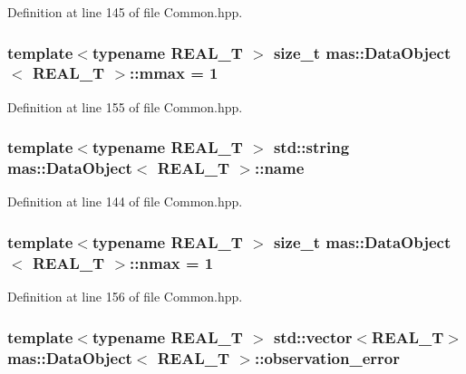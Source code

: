Definition at line 145 of file Common.\-hpp.

\hypertarget{structmas_1_1_data_object_aad1fab74aa21aaed012c6d50a77a8077}{
\subsubsection[{mmax}]{\setlength{\rightskip}{0pt plus 5cm}template$<$typename R\-E\-A\-L\-\_\-\-T $>$ size\-\_\-t {\bf mas\-::\-Data\-Object}$<$ R\-E\-A\-L\-\_\-\-T $>$\-::mmax = 1}}\label{structmas_1_1_data_object_aad1fab74aa21aaed012c6d50a77a8077}


Definition at line 155 of file Common.\-hpp.

\hypertarget{structmas_1_1_data_object_aa8aa73fed0094e9eb06dcc9aff390908}{
\subsubsection[{name}]{\setlength{\rightskip}{0pt plus 5cm}template$<$typename R\-E\-A\-L\-\_\-\-T $>$ std\-::string {\bf mas\-::\-Data\-Object}$<$ R\-E\-A\-L\-\_\-\-T $>$\-::name}}\label{structmas_1_1_data_object_aa8aa73fed0094e9eb06dcc9aff390908}


Definition at line 144 of file Common.\-hpp.

\hypertarget{structmas_1_1_data_object_aee973c338436ee4ee27a23a4bd855286}{
\subsubsection[{nmax}]{\setlength{\rightskip}{0pt plus 5cm}template$<$typename R\-E\-A\-L\-\_\-\-T $>$ size\-\_\-t {\bf mas\-::\-Data\-Object}$<$ R\-E\-A\-L\-\_\-\-T $>$\-::nmax = 1}}\label{structmas_1_1_data_object_aee973c338436ee4ee27a23a4bd855286}


Definition at line 156 of file Common.\-hpp.

\hypertarget{structmas_1_1_data_object_a030964e2f8db36cc6e9caa251c74eac5}{
\subsubsection[{observation\-\_\-error}]{\setlength{\rightskip}{0pt plus 5cm}template$<$typename R\-E\-A\-L\-\_\-\-T $>$ std\-::vector$<$R\-E\-A\-L\-\_\-\-T$>$ {\bf mas\-::\-Data\-Object}$<$ R\-E\-A\-L\-\_\-\-T $>$\-::observation\-\_\-error}}\label{structmas_1_1_data_object_a030964e2f8db36cc6e9caa251c74eac5}


